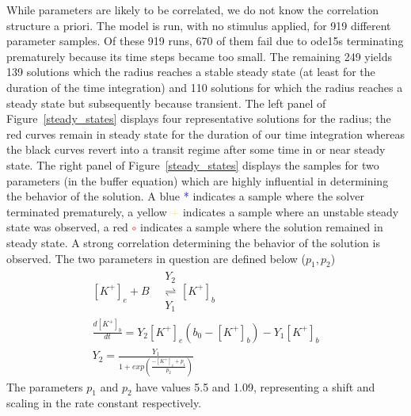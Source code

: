 While parameters are likely to be correlated, we do not know the correlation structure a priori. The model is run, with no stimulus applied, for 919 different parameter samples. Of these 919 runs, 670 of them fail due to ode15s terminating prematurely because its time steps became too small. The remaining 249 yields 139 solutions which the radius reaches a stable steady state (at least for the duration of the time integration) and 110 solutions for which the radius reaches a steady state but subsequently because transient. The left panel of Figure~\ref{steady_states} displays four representative solutions for the radius; the red curves remain in steady state for the duration of our time integration whereas the black curves revert into a transit regime after some time in or near steady state. The right panel of Figure~\ref{steady_states} displays the samples for two parameters (in the buffer equation) which are highly influential in determining the behavior of the solution. A blue \textcolor{blue}{*} indicates a sample where the solver terminated prematurely, a yellow \textcolor{yellow}{+} indicates a sample where an unstable steady state was observed, a red \textcolor{red}{$\circ$} indicates a sample where the solution remained in steady state. A strong correlation determining the behavior of the solution is observed. The two parameters in question are defined below ($p_1,p_2$)
\begin{eqnarray}\label{eqn:buff}
[K^+]_e+B \quad\begin{array}{c}
Y_2 \\ 
 \rightleftharpoons \\
Y_1
\end{array} 
[K^+]_b \nonumber \\
\frac{d[K^+]_b}{dt}=Y_2[K^+]_e(b_0-[K^+]_b)-Y_1[K^+]_b \nonumber \\
Y_2=\frac{Y_1}{1+exp(\frac{-[K^+]_e+p_1}{p_2})}
\end{eqnarray}
The parameters $p_1$ and $p_2$ have values 5.5 and 1.09, representing a shift and scaling in the rate constant respectively. 
